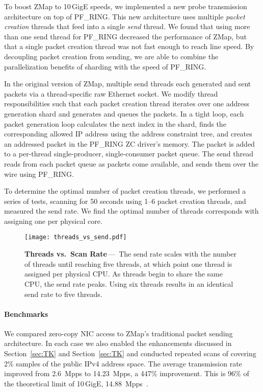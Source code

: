 To boost ZMap to 10\,GigE speeds, we implemented a new probe transmission
architecture on top of PF\_RING\@. This new architecture uses multiple
\emph{packet creation} threads that feed into a single \emph{send} thread. We
found that using more than one send thread for PF\_RING decreased the
performance of ZMap, but that a single packet creation thread was not fast
enough to reach line speed. By decoupling packet creation from sending, we
are able to combine the parallelization benefits of sharding with the speed
of PF\_RING\@.

In the original version of ZMap, multiple send threads each generated and
sent packets via a thread-specific raw Ethernet socket. We modify thread
responsibilities such that each packet creation thread iterates over one
address generation shard and generates and queues the packets. In a tight
loop, each packet generation loop calculates the next index in the shard,
finds the corresponding allowed IP address using the address constraint tree,
and creates an addressed packet in the PF\_RING ZC driver's memory. The
packet is added to a per-thread single-producer, single-consumer packet
queue. The send thread reads from each packet queue as packets come
available, and sends them over the wire using PF\_RING\@.

To determine the optimal number of packet creation threads, we performed a
series of tests, scanning for 50 seconds using 1--6 packet creation threads,
and measured the send rate. We find the optimal number of threads corresponds
with assigning one per physical core.

\begin{figure}\centering
\texttt{[image: threads\_vs\_send.pdf]}
\caption{\textbf{Threads vs.\ Scan Rate}\,---\,%
The send rate scales with the number of threads until reaching five threads,
at which point one thread is assigned per physical CPU. As threads begin to
share the same CPU, the send rate peaks. Using six threads results in an
identical send rate to five threads.
}
\label{fig:threads}
\end{figure}
\fi

\paragraph{Benchmarks}
We compared zero-copy NIC access to ZMap's traditional packet sending
architecture. In each case we also enabled the enhancements discussed in
Section~\ref{sec:TK} and Section~\ref{sec:TK} and conducted repeated scans of
covering 2\% samples of the public IPv4 address space. The average
transmission rate improved from 2.6~Mpps to 14.23~Mpps, a 447\% improvement.
This is 96\% of the theoretical limit of 10\,GigE,
14.88~Mpps~\cite{ten-gig-commodity}.
\fi

